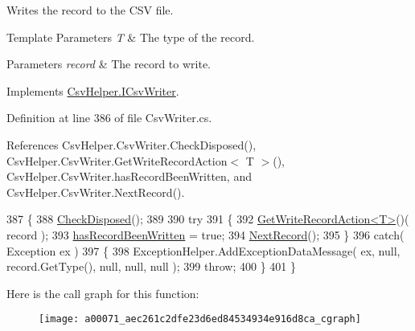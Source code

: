 Writes the record to the C\-S\-V file. 


\begin{DoxyTemplParams}{Template Parameters}
{\em T} & The type of the record.\\
\hline
\end{DoxyTemplParams}

\begin{DoxyParams}{Parameters}
{\em record} & The record to write.\\
\hline
\end{DoxyParams}


Implements \hyperlink{a00107_a9620a114ee9e858760f74013cf341f3a}{Csv\-Helper.\-I\-Csv\-Writer}.



Definition at line 386 of file Csv\-Writer.\-cs.



References Csv\-Helper.\-Csv\-Writer.\-Check\-Disposed(), Csv\-Helper.\-Csv\-Writer.\-Get\-Write\-Record\-Action$<$ T $>$(), Csv\-Helper.\-Csv\-Writer.\-has\-Record\-Been\-Written, and Csv\-Helper.\-Csv\-Writer.\-Next\-Record().


\begin{DoxyCode}
387         \{
388             \hyperlink{a00071_a15e26ec8c5c935030677bee9a36d7c16}{CheckDisposed}();
389 
390             \textcolor{keywordflow}{try}
391             \{
392                 \hyperlink{a00071_a147c7b5888823fdf81fb021db706181c}{GetWriteRecordAction<T>}()( record );
393                 \hyperlink{a00071_a0c31cd2b7d4eea93db887a46c33344fb}{hasRecordBeenWritten} = \textcolor{keyword}{true};
394                 \hyperlink{a00071_a397af8c87002d3b9c2b5152c6981d4d2}{NextRecord}();
395             \}
396             \textcolor{keywordflow}{catch}( Exception ex )
397             \{
398                 ExceptionHelper.AddExceptionDataMessage( ex, null, record.GetType(), null, null, null );
399                 \textcolor{keywordflow}{throw};
400             \}
401         \}
\end{DoxyCode}


Here is the call graph for this function\-:
\nopagebreak
\begin{figure}[H]
\begin{center}
\leavevmode
\texttt{[image: a00071\_aec261c2dfe23d6ed84534934e916d8ca\_cgraph]}
\end{center}
\end{figure}


